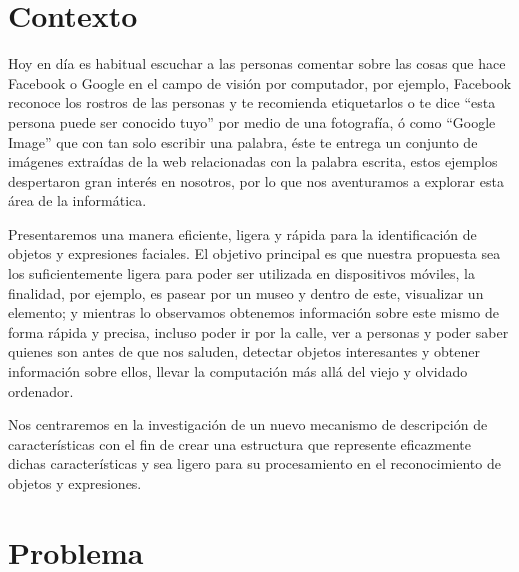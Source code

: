 \section{Contexto}\label{sub:Contexto}

Hoy en día es habitual escuchar a las personas comentar sobre las cosas que hace Facebook o Google en el campo de visión por computador, por ejemplo, Facebook reconoce los rostros de las personas y te recomienda etiquetarlos o te dice ``esta persona puede ser conocido tuyo'' por medio de una fotografía, ó como ``Google Image'' que con tan solo escribir una palabra, éste te entrega un conjunto de imágenes extraídas de la web relacionadas con la palabra escrita, estos ejemplos despertaron gran interés en nosotros, por lo que nos aventuramos a explorar esta área de la informática.

Presentaremos una manera eficiente, ligera y rápida para la identificación de objetos y expresiones faciales. El objetivo principal es que nuestra propuesta sea los suficientemente ligera para poder ser utilizada en dispositivos móviles, la finalidad, por ejemplo, es pasear por un museo y dentro de este, visualizar un elemento; y mientras lo observamos obtenemos información sobre este mismo de forma rápida y precisa, incluso poder ir por la calle, ver a personas y poder saber quienes son antes de que nos saluden, detectar objetos interesantes y obtener información sobre ellos, llevar la computación más allá del viejo y olvidado ordenador.

Nos centraremos en la investigación de un nuevo mecanismo de descripción de características con el fin de crear una estructura que represente eficazmente dichas características y sea ligero para su procesamiento en el reconocimiento de objetos y expresiones.

\section{Problema}\label{sec:problema}


